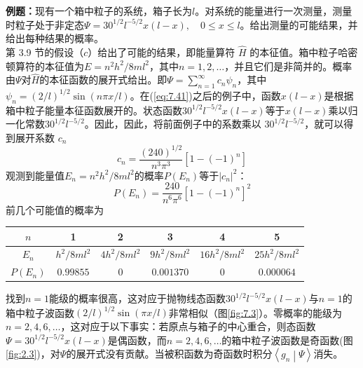    \begin{examplebox}
        \textbf{例题：}现有一个箱中粒子的系统，箱子长为$l$。对系统的能量进行一次测量，测量时粒子处于非定态$\Psi = 30^{1/2}l^{-5/2}x\left(l-x\right), \quad 0 \leq x \leq l$。给出测量的可能结果，并给出每种结果的概率。
        \\

        第 3.9 节的假设（$c$）给出了可能的结果，即能量算符 $\hat{H}$ 的本征值。箱中粒子哈密顿算符的本征值为$E = n^2h^2/8ml^2$，其中$n = 1, 2, \ldots$，并且它们是非简并的。概率由$\Psi$对$\hat{H}$的本征函数的展开式给出。即$\Psi = \sum_{n=1}^{\infty}c_n\psi_n$，其中$\psi_n = \left(2/l\right)^{1/2}\sin\left(n\pi x/l\right)$。在(\ref{eq:7.41})之后的例子中，函数$x\left(l-x\right)$是根据箱中粒子能量本征函数展开的。状态函数$30^{1/2}l^{-5/2}x\left(l-x\right)$等于$x\left(l-x\right)$乘以归一化常数$30^{1/2}l^{-5/2}$。因此，因此，将前面例子中的系数乘以 $30^{1/2}l^{-5/2}$，就可以得到展开系数 $c_n$
        \begin{equation*}
            c_n = \frac{\left(240\right)^{1/2}}{n^3\pi^3}\left[1-\left(-1\right)^n\right]
        \end{equation*}
        观测到能量值$E_n = n^2h^2/8ml^2$的概率$P\left(E_n\right)$等于$\left|c_n\right|^2$：
        \begin{equation}
            P\left(E_n\right) = \frac{240}{n^6\pi^6}\left[1-\left(-1\right)^n\right]^2
            \label{eq:7.74}
        \end{equation}前几个可能值的概率为
        \vspace{1em}
        \begin{center}
            \renewcommand{\arraystretch}{1.5}
            \begin{tabular}{c|c|c|c|c|c}
                 $n$ & 1 & 2 & 3 & 4 & 5 \\
                \hline
                $E_n$ & $h^2/8ml^2$ & $4h^2/8ml^2$ & $9h^2/8ml^2$ & $16h^2/8ml^2$ & $25h^2/8ml^2$ \\
                \hline
                $P\left(E_n\right)$ & $0.99855$ & $0$ & $0.001370$ & $0$ & $0.000064$
            \end{tabular}
        \end{center}
        \vspace{1em}
        找到$n=1$能级的概率很高，这对应于抛物线态函数$30^{1/2}l^{-5/2}x\left(l-x\right)$与$n=1$的箱中粒子波函数$\left(2/l\right)^{1/2}\sin\left(\pi x/l\right)$非常相似（图\ref{fig:7.3}）。零概率的能级为$n=2,4,6,\ldots$，这对应于以下事实：若原点与箱子的中心重合，则态函数$\Psi = 30^{1/2}l^{-5/2}x\left(l-x\right)$是偶函数，而$n=2,4,6,\ldots$的箱中粒子波函数是奇函数(图\ref{fig:2.3})，对$\Psi$的展开式没有贡献。当被积函数为奇函数时积分$\left\langle g_n \middle| \Psi \right\rangle$消失。

\end{examplebox}

